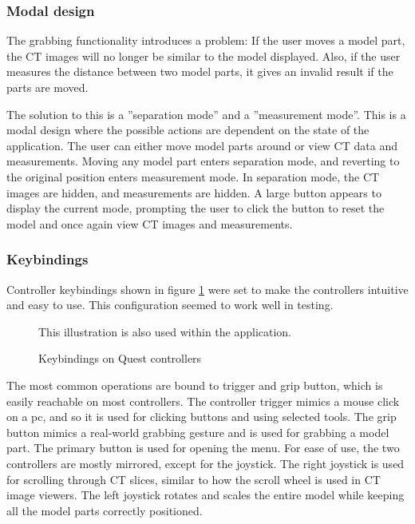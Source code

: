\documentclass[a4paper]{report}
\begin{document}
\subsubsection{Modal design}
The grabbing functionality introduces a problem: If the user moves a model part, the CT images will no longer be similar to the model displayed. Also, if the user measures the distance between two model parts, it gives an invalid result if the parts are moved.

The solution to this is a ''separation mode'' and a ''measurement mode''. This is a modal design where the possible actions are dependent on the state of the application. The user can either move model parts around or view CT data and measurements. Moving any model part enters separation mode, and reverting to the original position enters measurement mode. In separation mode, the CT images are hidden, and measurements are hidden. A large button appears to display the current mode, prompting the user to click the button to reset the model and once again view CT images and measurements.

\subsubsection{Keybindings}
Controller keybindings shown in figure \ref{controllers} were set to make the controllers intuitive and easy to use. This configuration seemed to work well in testing.

\begin{figure}[h!]
    \centering
	\hfill
	\caption{Keybindings on Quest controllers}\label{controllers}
  \small
  This illustration is also used within the application.
\end{figure}

The most common operations are bound to trigger and grip button, which is easily reachable on most controllers. The controller trigger mimics a mouse click on a pc, and so it is used for clicking buttons and using selected tools. The grip button mimics a real-world grabbing gesture and is used for grabbing a model part.
The primary button is used for opening the menu.
For ease of use, the two controllers are mostly mirrored, except for the joystick. The right joystick is used for scrolling through CT slices, similar to how the scroll wheel is used in CT image viewers. The left joystick rotates and scales the entire model while keeping all the model parts correctly positioned.
\end{document}
